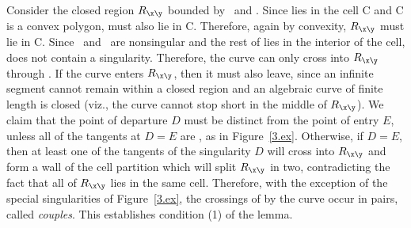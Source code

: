 Consider the closed region $R_{\x\y}$ bounded by \seg{\x\y}\ and \arc{\x\y}.
Since \arc{\x\y} lies in the cell C and C is a convex polygon, \seg{\x\y} 
must also lie in C.
Therefore, again by convexity, $R_{\x\y}$ must lie in C.
%
Since \x\ and \y\ are nonsingular and the rest of \arc{\x\y} lies in the
interior of the cell, \arc{\x\y} does not contain a singularity.
Therefore, the curve can only cross into $R_{\x\y}$ through \seg{\x\y}.
If the curve enters $R_{\x\y}$, then it must also leave, since an infinite 
segment cannot remain within a closed region and an algebraic curve of finite
length is closed (viz., the curve cannot stop short in the middle of $R_{\x\y}$).
We claim that the point of departure $D$ must be distinct from the point of 
entry $E$, unless all of the tangents at $D=E$ are , as in 
Figure~\ref{3.ex}.
Otherwise, if $D=E$, then at least one of the tangents of the singularity $D$ 
will cross into $R_{\x\y}$ and form a wall of the cell partition which will 
split $R_{\x\y}$ in two, contradicting the fact that all of $R_{\x\y}$ 
lies in the same cell.
Therefore, with the exception of the special singularities of 
Figure~\ref{3.ex}, the crossings of \seg{\x\y} by the curve occur in pairs,
called {\em couples}.
This establishes condition (1) of the lemma.



